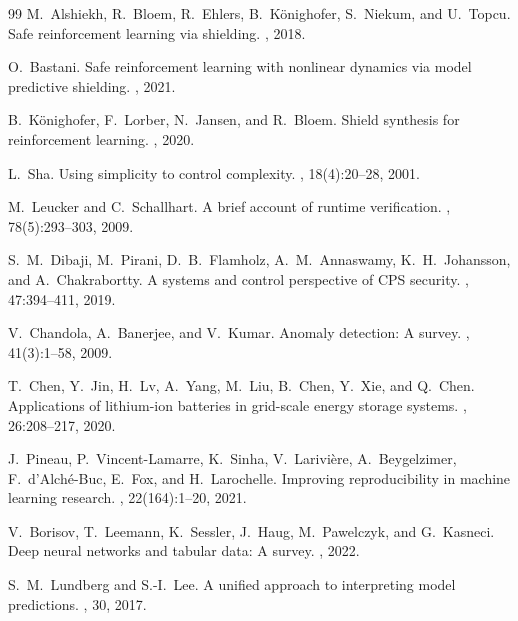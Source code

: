 \documentclass[11pt,a4paper]{article}
\begin{document}
\begin{thebibliography}{99}
M.~Alshiekh, R.~Bloem, R.~Ehlers, B.~K\"onighofer, S.~Niekum, and U.~Topcu.
\newblock Safe reinforcement learning via shielding.
, 2018.

O.~Bastani.
\newblock Safe reinforcement learning with nonlinear dynamics via model predictive shielding.
, 2021.

B.~K\"onighofer, F.~Lorber, N.~Jansen, and R.~Bloem.
\newblock Shield synthesis for reinforcement learning.
, 2020.

L.~Sha.
\newblock Using simplicity to control complexity.
, 18(4):20--28, 2001.

M.~Leucker and C.~Schallhart.
\newblock A brief account of runtime verification.
, 78(5):293--303, 2009.

S.~M.~Dibaji, M.~Pirani, D.~B.~Flamholz, A.~M.~Annaswamy, K.~H.~Johansson, and A.~Chakrabortty.
\newblock A systems and control perspective of {CPS} security.
, 47:394--411, 2019.

V.~Chandola, A.~Banerjee, and V.~Kumar.
\newblock Anomaly detection: A survey.
, 41(3):1--58, 2009.

T.~Chen, Y.~Jin, H.~Lv, A.~Yang, M.~Liu, B.~Chen, Y.~Xie, and Q.~Chen.
\newblock Applications of lithium-ion batteries in grid-scale energy storage systems.
, 26:208--217, 2020.

J.~Pineau, P.~Vincent-Lamarre, K.~Sinha, V.~Larivi\`{e}re, A.~Beygelzimer, F.~d'Alch\'e-Buc, E.~Fox, and H.~Larochelle.
\newblock Improving reproducibility in machine learning research.
, 22(164):1--20, 2021.

V.~Borisov, T.~Leemann, K.~Sessler, J.~Haug, M.~Pawelczyk, and G.~Kasneci.
\newblock Deep neural networks and tabular data: A survey.
, 2022.

S.~M.~Lundberg and S.-I.~Lee.
\newblock A unified approach to interpreting model predictions.
, 30, 2017.

\end{thebibliography}
\end{document}
